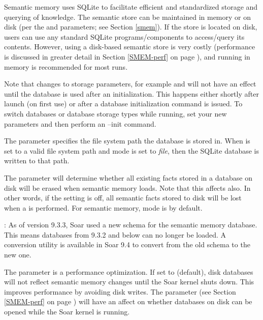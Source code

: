 Semantic memory uses SQLite to facilitate efficient and standardized storage and querying of knowledge.  
The semantic store can be maintained in memory or on disk (per the  and  parameters; see Section \ref{smem}). 
If the store is located on disk, users can use any standard SQLite programs/components to access/query its contents.
However, using a disk-based semantic store is very costly (performance is discussed in greater detail in Section \ref{SMEM-perf} on page \pageref{SMEM-perf}), and running in memory is recommended for most runs.

Note that changes to storage parameters, for example  and  will not have an effect until the database is used after an initialization. This happens either shortly after launch (on first use) or after a database initialization command is issued. To switch databases or database storage types while running, set your new parameters and then perform an --init command.

The  parameter specifies the file system path the database is stored in. When  is set to a valid file system path and  mode is set to \emph{file}, then the SQLite database is written to that path.

The  parameter will determine whether all existing facts stored in a database on disk will be erased when semantic memory loads. Note that this affects  also.  In other words, if the  setting is off, all semantic facts stored to disk will be lost when a  is performed. For semantic memory,  mode is  by default.

: As of version 9.3.3, Soar used a new schema for the semantic memory database. This means databases from 9.3.2 and below can no longer be loaded.  A conversion utility is available in Soar 9.4 to convert from the old schema to the new one.

The  parameter is a performance optimization. 
If set to  (default), disk databases will not reflect semantic memory changes until the Soar kernel shuts down. 
This improves performance by avoiding disk writes. 
The  parameter (see Section \ref{SMEM-perf} on page \pageref{SMEM-perf}) will have an affect on whether databases on disk can be opened while the Soar kernel is running.


